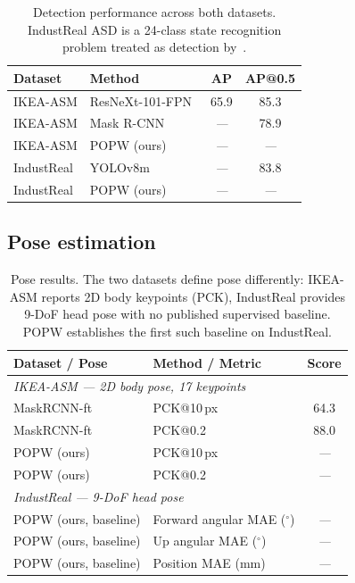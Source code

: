 \documentclass[11pt,a4paper]{article}
\newcommand{\popw}{POPW}
\newcommand{\ikea}{IKEA-ASM}
\newcommand{\industreal}{IndustReal}
\newcommand{\todo}{\textit{---}}              %
\newcommand{\popwres}{\todo}                  %
\begin{document}
\begin{table}[!htbp]
\centering
\small
\caption{Detection performance across both datasets. \industreal{} ASD is a 24-class
state recognition problem treated as detection by~\cite{schoonbeek2024industreal}.}
\label{tab:detection-breakdown}
\renewcommand{\arraystretch}{1.15}
\begin{tabular}{l l c c}
\toprule
\textbf{Dataset} & \textbf{Method} & \textbf{AP} & \textbf{AP@0.5} \\
\midrule
\ikea{}        & ResNeXt-101-FPN~\cite{benshabat2021ikea}   & 65.9 & 85.3 \\
\ikea{}        & Mask R-CNN~\cite{benshabat2021ikea}        & \todo & 78.9 \\
\ikea{}        & \popw{} (ours)                             & \popwres & \popwres \\
\midrule
\industreal{}  & YOLOv8m~\cite{schoonbeek2024industreal}    & \todo & 83.8 \\
\industreal{}  & \popw{} (ours)                             & \popwres & \popwres \\
\bottomrule
\end{tabular}
\end{table}

\subsection{Pose estimation}
\label{sec:pose-breakdown}

\begin{table}[!htbp]
\centering
\small
\caption{Pose results. The two datasets define pose differently: \ikea{} reports 2D body
keypoints (PCK), \industreal{} provides 9-DoF head pose with no published supervised baseline.
\popw{} establishes the first such baseline on \industreal{}.}
\label{tab:pose-breakdown}
\renewcommand{\arraystretch}{1.15}
\begin{tabular}{l l c}
\toprule
\textbf{Dataset / Pose} & \textbf{Method / Metric} & \textbf{Score} \\
\midrule
\multicolumn{3}{l}{\textit{\ikea{} --- 2D body pose, 17 keypoints}} \\
MaskRCNN-ft~\cite{benshabat2021ikea}    & PCK@10\,px         & 64.3 \\
MaskRCNN-ft~\cite{benshabat2021ikea}    & PCK@0.2            & 88.0 \\
\popw{} (ours)                          & PCK@10\,px         & \popwres \\
\popw{} (ours)                          & PCK@0.2            & \popwres \\
\midrule
\multicolumn{3}{l}{\textit{\industreal{} --- 9-DoF head pose}} \\
\popw{} (ours, baseline)                & Forward angular MAE ($^\circ$) & \popwres \\
\popw{} (ours, baseline)                & Up angular MAE ($^\circ$)      & \popwres \\
\popw{} (ours, baseline)                & Position MAE (mm)              & \popwres \\
\bottomrule
\end{tabular}
\end{table}
\end{document}
